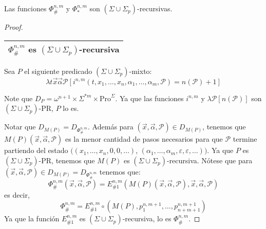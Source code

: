   \begin{theorem}
    \PN Las funciones $\Phi_{\#}^{n,m}$ y $\Phi_{\ast}^{n,m}$ son $(\Sigma \cup \Sigma_{p})$-recursivas.
  \end{theorem}
  \begin{proof}
    \begin{tabular}{|c|} \hline $\Phi_{\#}^{n,m}$ es $(\Sigma \cup \Sigma_{p})$-recursiva \\\hline \end{tabular}

    \vspace{2mm}
    \PN Sea $P$ el siguiente predicado $(\Sigma \cup \Sigma_{p})$-mixto:
    \[
      \lambda t\vec{x}\vec{\alpha}\mathcal{P}\left[i^{n,m}(t,x_{1},\dotsc,x_{n},\alpha_{1},\dotsc,\alpha_{m},
      \mathcal{P}) = n(\mathcal{P}) + 1\right]
    \]

    \PN Note que $D_{P} = \omega^{n+1} \times \Sigma^{\ast m} \times \mathrm{Pro}^{\Sigma}$. Ya que las funciones
    $i^{n,m}$ y $\lambda \mathcal{P} \left[n(\mathcal{P})\right]$ son $(\Sigma \cup \Sigma_{p})$-PR, $P$ lo es.

    \PN Notar que $D_{M(P)} = D_{\Phi_{\#}^{n,m}}$. Además para $(\vec{x},\vec{\alpha},\mathcal{P}) \in D_{M(P)}$,
    tenemos que $M(P)(\vec{x},\vec{\alpha},\mathcal{P})$ es la menor cantidad de pasos necesarios para que $\mathcal{P}$
    termine partiendo del estado $((x_{1},\dotsc,x_{n},0,0,\dotsc)$, \linebreak $(\alpha_{1},\dotsc,\alpha_{m},
    \varepsilon,\varepsilon,\dotsc))$. Ya que $P$ es $(\Sigma \cup \Sigma_{p})$-PR, tenemos que $M(P)$ es
    $(\Sigma \cup \Sigma_{p})$-recursiva. Nótese que para $(\vec{x},\vec{\alpha},\mathcal{P}) \in D_{M(P)} =
    D_{\Phi_{\#}^{n,m}}$ tenemos que:
    \[
      \Phi_{\#}^{n,m}(\vec{x},\vec{\alpha},\mathcal{P}) = E_{\#1}^{n,m}\left(M(P)(\vec{x},\vec{\alpha},\mathcal{P}),
      \vec{x},\vec{\alpha},\mathcal{P}\right)
    \]
    \PN es decir,
    \[
      \Phi_{\#}^{n,m} = E_{\#1}^{n,m} \circ \left(M(P),p_{1}^{n,m+1},\dotsc,p_{n+m+1}^{n,m+1}\right)
    \]
    \PN Ya que la función $E_{\#1}^{n,m}$ es $(\Sigma \cup \Sigma_{p})$-recursiva, lo es $ \Phi _{\#}^{n,m}$.


\end{proof}
